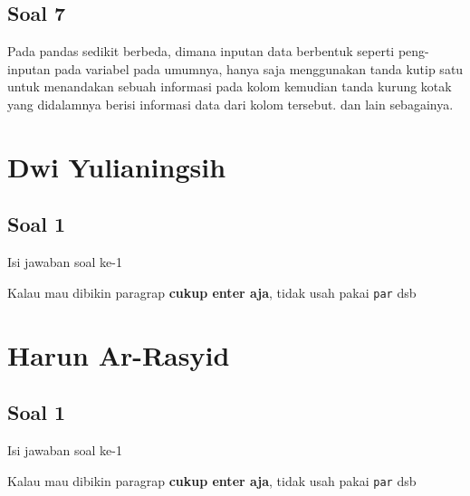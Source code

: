 	\subsection{Soal 7}
	Pada pandas sedikit berbeda, dimana inputan data berbentuk seperti peng-inputan pada variabel pada umumnya, hanya saja menggunakan tanda kutip satu untuk menandakan sebuah informasi pada kolom kemudian tanda kurung kotak yang didalamnya berisi informasi data dari kolom tersebut. dan lain sebagainya.

\section{Dwi Yulianingsih}
\subsection{Soal 1}
Isi jawaban soal ke-1

Kalau mau dibikin paragrap \textbf{cukup enter aja}, tidak usah pakai \verb|par| dsb



\section{Harun Ar-Rasyid}
\subsection{Soal 1}
Isi jawaban soal ke-1

Kalau mau dibikin paragrap \textbf{cukup enter aja}, tidak usah pakai \verb|par| dsb



